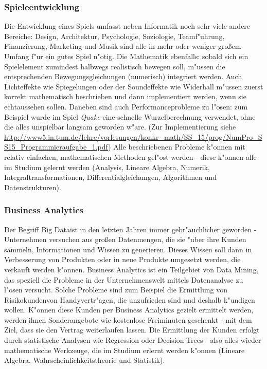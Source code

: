 \subsubsection{Spieleentwicklung}
Die Entwicklung eines Spiels umfasst neben Informatik noch sehr viele andere Bereiche: Design, Architektur, Psychologie, Soziologie, Teamf"uhrung, Finanzierung, Marketing und Musik sind alle in mehr oder weniger gro\ss em Umfang f"ur ein gutes Spiel n"otig. Die Mathematik ebenfalls: sobald sich ein Spielelement zumindest halbwegs realistisch bewegen soll, m"ussen die entsprechenden Bewegungsgleichungen (numerisch) integriert werden. Auch Lichteffekte wie Spiegelungen oder der Soundeffekte wie Widerhall m"ussen zuerst korrekt mathematisch beschrieben und dann implementiert werden, wenn sie \glqq echt\grqq aussehen sollen. Daneben sind auch Performanceprobleme zu l"osen: zum Beispiel wurde im Spiel \emph{Quake} eine schnelle Wurzelberechnung verwendet, ohne die alles unspielbar langsam geworden w"are. (Zur Implementierung siehe \url{http://www5.in.tum.de/lehre/vorlesungen/konkr_math/SS_15/prog/NumPro_SS15_Programmieraufgabe_1.pdf})
Alle beschriebenen Probleme k"on\-nen mit relativ einfachen, mathematischen Methoden gel"ost werden - diese k"onnen alle im Studium gelernt werden (Analysis, Lineare Algebra, Numerik, Integraltransformationen, Differentialgleichungen, Algorithmen und Datenstrukturen).

\subsubsection{Business Analytics}
Der Begriff \glqq Big Data\grqq ist in den letzten Jahren immer gebr"auchlicher geworden - Unternehmen versuchen aus gro\ss en Datenmengen, die sie "uber ihre Kunden sammeln, Informationen und Wissen zu generieren. Dieses Wissen soll dann in Verbesserung von Produkten oder in neue Produkte umgesetzt werden, die verkauft werden k"onnen. Business Analytics ist ein Teilgebiet von Data Mining, das speziell die Probleme in der Unternehmenswelt mittels Datenanalyse zu l"osen versucht. Solche Probleme sind zum Beispiel die Ermittlung von \glqq Risikokunden\grqq von Handyvertr"agen, die unzufrieden sind und deshalb k"undigen wollen. K"onnen diese Kunden per Business Analytics gezielt ermittelt werden, werden ihnen Sonderangebote wie kostenlose Freiminuten geschenkt - mit dem Ziel, dass sie den Vertrag weiterlaufen lassen. Die Ermittlung der Kunden erfolgt durch statistische Analysen wie Regression oder Decision Trees - also alles wieder mathematische Werkzeuge, die im Studium erlernt werden k"onnen (Lineare Algebra, Wahrscheinlichkeitstheorie und Statistik).

